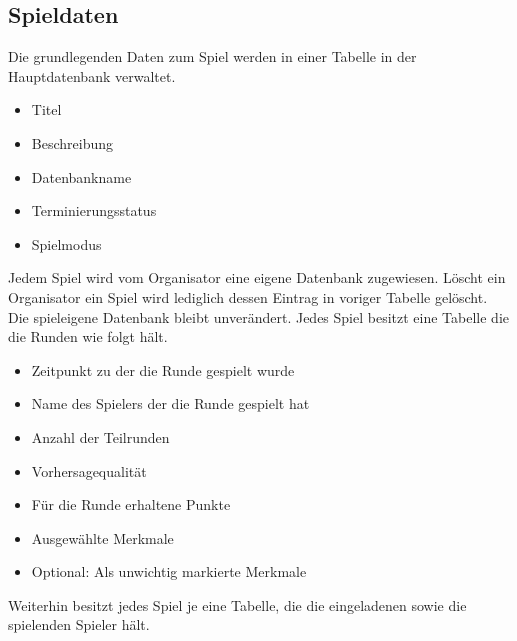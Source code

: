 \documentclass[a4paper]{scrreprt}
\begin{document}
	\subsection{Spieldaten}
	Die grundlegenden Daten zum Spiel werden in einer Tabelle in der Hauptdatenbank verwaltet.
	\begin{itemize}
		\item Titel
		\item Beschreibung
		\item Datenbankname
		\item Terminierungsstatus
		\item Spielmodus
	\end{itemize}
	Jedem Spiel wird vom Organisator eine eigene Datenbank zugewiesen.
	Löscht ein Organisator ein Spiel wird lediglich dessen Eintrag in voriger Tabelle gelöscht.
	Die spieleigene Datenbank bleibt unverändert.
	Jedes Spiel besitzt eine Tabelle die die Runden wie folgt hält.
	\begin{itemize}
		\item Zeitpunkt zu der die Runde gespielt wurde
		\item Name des Spielers der die Runde gespielt hat
		\item Anzahl der Teilrunden
		\item Vorhersagequalität
		\item Für die Runde erhaltene Punkte
		\item Ausgewählte Merkmale
		\item Optional: Als unwichtig markierte Merkmale
	\end{itemize}
	Weiterhin besitzt jedes Spiel je eine Tabelle, die die eingeladenen sowie die spielenden Spieler hält.
	
	
	
\end{document}
